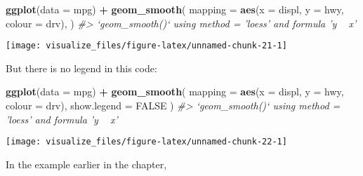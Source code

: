 \documentclass[]{book}
\newenvironment{Shaded}{\begin{snugshade}}{\end{snugshade}}
\newcommand{\CommentTok}[1]{\textcolor[rgb]{0.56,0.35,0.01}{\textit{#1}}}
\newcommand{\DataTypeTok}[1]{\textcolor[rgb]{0.13,0.29,0.53}{#1}}
\newcommand{\KeywordTok}[1]{\textcolor[rgb]{0.13,0.29,0.53}{\textbf{#1}}}
\newcommand{\NormalTok}[1]{#1}
\newcommand{\OperatorTok}[1]{\textcolor[rgb]{0.81,0.36,0.00}{\textbf{#1}}}
\newcommand{\OtherTok}[1]{\textcolor[rgb]{0.56,0.35,0.01}{#1}}
\newcommand{\StringTok}[1]{\textcolor[rgb]{0.31,0.60,0.02}{#1}}
\theoremstyle{plain}
\theoremstyle{remark}
\theoremstyle{definition}
\theoremstyle{definition}
\theoremstyle{definition}
\theoremstyle{remark}
\begin{document}
\begin{Shaded}
\begin{Highlighting}[]
\KeywordTok{ggplot}\NormalTok{(}\DataTypeTok{data =}\NormalTok{ mpg) }\OperatorTok{+}
\StringTok{  }\KeywordTok{geom_smooth}\NormalTok{(}
    \DataTypeTok{mapping =} \KeywordTok{aes}\NormalTok{(}\DataTypeTok{x =}\NormalTok{ displ, }\DataTypeTok{y =}\NormalTok{ hwy, }\DataTypeTok{colour =}\NormalTok{ drv),}
\NormalTok{  )}
\CommentTok{#> `geom_smooth()` using method = 'loess' and formula 'y ~ x'}
\end{Highlighting}
\end{Shaded}

\begin{center}\texttt{[image: visualize\_files/figure-latex/unnamed-chunk-21-1]} \end{center}

But there is no legend in this code:

\begin{Shaded}
\begin{Highlighting}[]
\KeywordTok{ggplot}\NormalTok{(}\DataTypeTok{data =}\NormalTok{ mpg) }\OperatorTok{+}
\StringTok{  }\KeywordTok{geom_smooth}\NormalTok{(}
    \DataTypeTok{mapping =} \KeywordTok{aes}\NormalTok{(}\DataTypeTok{x =}\NormalTok{ displ, }\DataTypeTok{y =}\NormalTok{ hwy, }\DataTypeTok{colour =}\NormalTok{ drv),}
    \DataTypeTok{show.legend =} \OtherTok{FALSE}
\NormalTok{  )}
\CommentTok{#> `geom_smooth()` using method = 'loess' and formula 'y ~ x'}
\end{Highlighting}
\end{Shaded}

\begin{center}\texttt{[image: visualize\_files/figure-latex/unnamed-chunk-22-1]} \end{center}

In the example earlier in the chapter,
\end{document}
